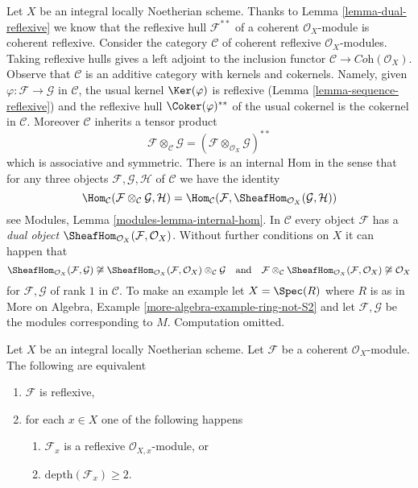 \begin{remark}
\label{remark-tensor}
Let $X$ be an integral locally Noetherian scheme. Thanks to
Lemma \ref{lemma-dual-reflexive} we know that the reflexive
hull $\mathcal{F}^{**}$ of a coherent $\mathcal{O}_X$-module
is coherent reflexive. Consider the category $\mathcal{C}$
of coherent reflexive $\mathcal{O}_X$-modules. Taking
reflexive hulls gives a left adjoint to the inclusion functor
$\mathcal{C} \to \textit{Coh}(\mathcal{O}_X)$.
Observe that $\mathcal{C}$ is an additive category
with kernels and cokernels. Namely, given
$\varphi : \mathcal{F} \to \mathcal{G}$ in $\mathcal{C}$, the
usual kernel $\Ker(\varphi)$ is reflexive
(Lemma \ref{lemma-sequence-reflexive}) and the reflexive hull
$\Coker(\varphi)^{**}$ of the usual cokernel
is the cokernel in $\mathcal{C}$. Moreover $\mathcal{C}$ inherits
a tensor product
$$
\mathcal{F} \otimes_\mathcal{C} \mathcal{G} =
(\mathcal{F} \otimes_{\mathcal{O}_X} \mathcal{G})^{**}
$$
which is associative and symmetric. There is an internal Hom
in the sense that for any three objects
$\mathcal{F}, \mathcal{G}, \mathcal{H}$ of
$\mathcal{C}$ we have the identity
$$
\Hom_\mathcal{C}(\mathcal{F} \otimes_\mathcal{C} \mathcal{G}, \mathcal{H}) =
\Hom_\mathcal{C}(\mathcal{F},
\SheafHom_{\mathcal{O}_X}(\mathcal{G}, \mathcal{H}))
$$
see Modules, Lemma \ref{modules-lemma-internal-hom}. In $\mathcal{C}$
every object $\mathcal{F}$ has a {\it dual object}
$\SheafHom_{\mathcal{O}_X}(\mathcal{F}, \mathcal{O}_X)$.
Without further conditions on $X$ it can happen that
$$
\SheafHom_{\mathcal{O}_X}(\mathcal{F}, \mathcal{G}) \not \cong 
\SheafHom_{\mathcal{O}_X}(\mathcal{F}, \mathcal{O}_X)
\otimes_\mathcal{C} \mathcal{G}
\quad\text{and}\quad
\mathcal{F} \otimes_\mathcal{C}
\SheafHom_{\mathcal{O}_X}(\mathcal{F}, \mathcal{O}_X)
\not \cong \mathcal{O}_X
$$
for $\mathcal{F}, \mathcal{G}$ of rank $1$ in $\mathcal{C}$.
To make an example let $X = \Spec(R)$ where $R$ is as in
More on Algebra, Example \ref{more-algebra-example-ring-not-S2}
and let $\mathcal{F}, \mathcal{G}$ be the modules corresponding to $M$.
Computation omitted.
\end{remark}

\begin{lemma}
\label{lemma-reflexive-depth-2}
Let $X$ be an integral locally Noetherian scheme. Let $\mathcal{F}$
be a coherent $\mathcal{O}_X$-module. The following are equivalent
\begin{enumerate}
\item $\mathcal{F}$ is reflexive,
\item for each $x \in X$ one of the following happens
\begin{enumerate}
\item $\mathcal{F}_x$ is a reflexive $\mathcal{O}_{X, x}$-module, or
\item $\text{depth}(\mathcal{F}_x) \geq 2$.
\end{enumerate}
\end{enumerate}
\end{lemma}

